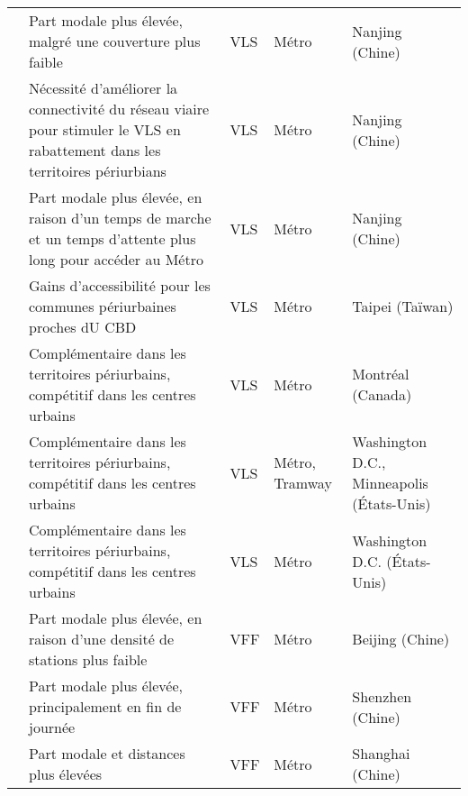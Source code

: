 \begin{longtable}{p{3cm}p{4cm}p{1.5cm}p{1.8cm}p{2.3cm}}
    \small{\textcite{ma_measuring_2018}}\index{Ma, Xinwei|pagebf} & \small{Part modale plus élevée, malgré une couverture plus faible} & \small{VLS} & \small{Métro} & \small{Nanjing (Chine)}\\
    \small{\textcite{ji_exploring_2018}}\index{Ji, Yanjie|pagebf} & \small{Nécessité d'améliorer la connectivité du réseau viaire pour stimuler le VLS en \gls{rabattement} dans les territoires périurbians} & \small{VLS} & \small{Métro} & \small{Nanjing (Chine)}\\
    \small{\textcite{ma_understanding_2018}}\index{Ma, Xinwei|pagebf} & \small{Part modale plus élevée, en raison d'un temps de marche et un temps d'attente plus long pour accéder au Métro} & \small{VLS} & \small{Métro} & \small{Nanjing (Chine)}\\
    \small{\textcite{yen_how_2023}}\index{Yen, Barbara T.H.|pagebf} & \small{Gains d'accessibilité pour les communes périurbaines proches dU \acrshort{CBD}} & \small{VLS} & \small{Métro} & \small{Taipei (Taïwan)}\\
    \small{\textcite{tarpin-pitre_typology_2020}}\index{Tarpin-Pitre, Léandre|pagebf} & \small{Complémentaire dans les territoires périurbains, compétitif dans les centres urbains} & \small{VLS} & \small{Métro} & \small{Montréal (Canada)}\\
    \small{\textcite{martin_evaluating_2014}}\index{Martin, Elliot W.|pagebf} & \small{Complémentaire dans les territoires périurbains, compétitif dans les centres urbains} & \small{VLS} & \small{Métro, Tramway} & \small{Washington D.C., Minneapolis (États-Unis)}\\
    \small{\textcite{ma_estimating_2019}}\index{Ma, Ting|pagebf} & \small{Complémentaire dans les territoires périurbains, compétitif dans les centres urbains} & \small{VLS} & \small{Métro} & \small{Washington D.C. (États-Unis)}\\
    \small{\textcite{fan_dockless_2020}}\index{Fan, Yichun|pagebf} & \small{Part modale plus élevée, en raison d'une densité de stations plus faible} & \small{VFF} & \small{Métro} & \small{Beijing (Chine)}\\
    \small{\textcite{guo_dockless_2021}}\index{Guo, Yuanyuan|pagebf} & \small{Part modale plus élevée, principalement en fin de journée} & \small{VFF} & \small{Métro} & \small{Shenzhen (Chine)}\\
    \small{\textcite{hu_examining_2022}}\index{Hu, Songhua|pagebf} & \small{Part modale et distances plus élevées} & \small{VFF} & \small{Métro} & \small{Shanghai (Chine)}\\

\end{longtable}
